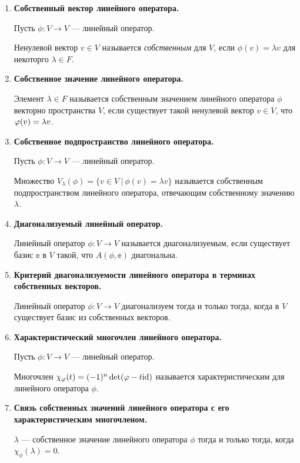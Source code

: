 \begin{enumerate}
\item \textbf{Собственный вектор линейного оператора.}

Пусть $\phi\colon V \rightarrow V$ --- линейный оператор.

Ненулевой вектор $v\in V$ называется \textit{собственным} для $V$, если $\phi(v) = \lambda v$ для некоторго $\lambda \in F$.

\item \textbf{Собственное значение линейного оператора.}

Элемент $\lambda \in F$ называется собственным значением линейного оператора $\phi$ векторно пространства $V$, если существует такой ненулевой вектор $v \in V$, что $\varphi(v) = \lambda v$. 

\item \textbf{Собственное подпространство линейного оператора.}

Пусть $\phi\colon V \rightarrow V$ --- линейный оператор.

Множество $V_{\lambda}(\phi) = \{v\in V\ |\ \phi(v) = \lambda v\}$ называется собственным подпространством линейного оператора, отвечающим собственному значению $\lambda$.

\item \textbf{Диагонализуемый линейный оператор.}

Линейный оператор $\phi\colon V \rightarrow V$ называется диагонализуемым, если существует базис $\mathbb{e}$ в $V$ такой, что $A(\phi, \mathbb{e})$ диагональна. 

\item \textbf{Критерий диагонализуемости линейного оператора в терминах собственных векторов.}

Линейный оператор $\phi\colon V \rightarrow V$ диагонализуем тогда и только тогда, когда в $V$ существует базис из собственных векторов.

\item \textbf{Характеристический многочлен линейного оператора.}

Пусть $\phi\colon V \rightarrow V$ --- линейный оператор.

Многочлен $\chi_{\varphi}(t) = (-1)^n\det(\varphi - t \mathrm{id})$ называется характеристическим для линейного оператора $\phi$.

\item \textbf{Связь собственных значений линейного оператора с его характеристическим многочленом.}

$\lambda$ --- собственное значение линейного оператора $\phi$ тогда и только тогда, когда $\chi_\phi(\lambda) = 0$. 


\end{enumerate}
